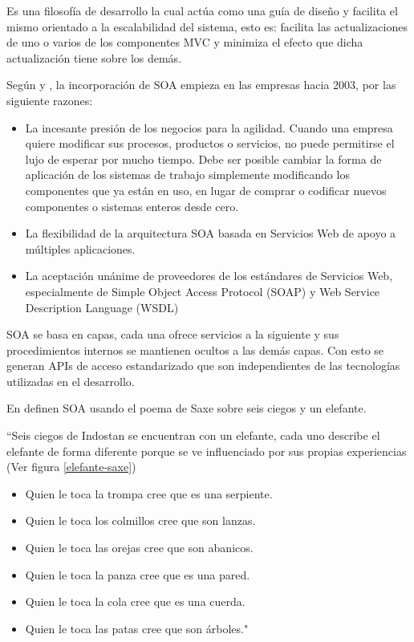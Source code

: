     Es una filosofía de desarrollo la cual actúa como una guía de diseño y facilita el mismo orientado a la escalabilidad del sistema, esto es: facilita las actualizaciones de uno o varios de los componentes MVC y minimiza el efecto que dicha actualización tiene sobre los demás.
    
    Según \citeauthor{SOA-libroGartner}\cite{SOA-libroGartner} y \citeauthor{SOA-tesis}\cite{SOA-tesis}, la incorporación de SOA empieza en las empresas hacia 2003, por las siguiente razones:
    
    \begin{itemize}
        \item La incesante presión de los negocios para la agilidad. Cuando una empresa quiere
        modificar sus procesos, productos o servicios, no puede permitirse el lujo de esperar por
        mucho tiempo. Debe ser posible cambiar la forma de aplicación de los sistemas de
        trabajo simplemente modificando los componentes que ya están en uso, en lugar de
        comprar o codificar nuevos componentes o sistemas enteros desde cero.
        
        \item La flexibilidad de la arquitectura SOA basada en Servicios Web de apoyo a múltiples
        aplicaciones.
        
        \item  La aceptación unánime de proveedores de los estándares de Servicios Web,
        especialmente de Simple Object Access Protocol (SOAP) y Web Service Description
        Language (WSDL)\cite{SOA-libroGartner}
        
    \end{itemize}
    
    SOA se basa en capas, cada una ofrece servicios a la siguiente y sus procedimientos internos se mantienen ocultos a las demás capas. Con esto se generan APIs de acceso estandarizado que son independientes de las tecnologías utilizadas en el desarrollo.
    
    En \cite{SOA-msdn} definen SOA usando el poema de Saxe sobre seis ciegos y un elefante.
    
    ``Seis ciegos de Indostan se encuentran con un elefante, cada uno describe el elefante de forma diferente porque se ve influenciado por sus propias experiencias (Ver figura \ref{elefante-saxe})
    
    \begin{itemize}
        \item Quien le toca la trompa cree que es una serpiente.
        \item Quien le toca los colmillos cree que son lanzas.
        \item Quien le toca las orejas cree que son abanicos.
        \item Quien le toca la panza cree que es una pared.
        \item Quien le toca la cola cree que es una cuerda.
        \item Quien le toca	las patas cree que son árboles."
    \end{itemize}
    

